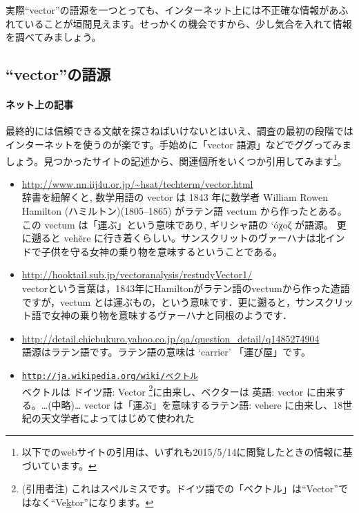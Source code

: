 実際``vector''の語源を一つとっても、インターネット上には不正確な情報があふれていることが垣間見えます。せっかくの機会ですから、少し気合を入れて情報を調べてみましょう。

\subsection{``vector''の語源}

\paragraph{ネット上の記事}

最終的には信頼できる文献を探さねばいけないとはいえ、調査の最初の段階ではインターネットを使うのが楽です。手始めに「vector 語源」などでググってみましょう。見つかったサイトの記述から、関連個所をいくつか引用してみます\footnote{以下でのwebサイトの引用は、いずれも2015/5/14に閲覧したときの情報に基づいています。}。

\begin{itemize}
\item \url{http://www.nn.iij4u.or.jp/~hsat/techterm/vector.html} \\
辞書を紐解くと, 数学用語の vector は 1843 年に数学者 William Rowen Hamilton (ハミルトン)(1805--1865) がラテン語 vectum から作ったとある。この vectum は「運ぶ」という意味であり, ギリシャ語の `\'oχoζ が語源。 更に遡ると veh\u{e}re に行き着くらしい。サンスクリットのヴァーハナは北インドで子供を守る女神の乗り物を意味するということである。
\item \url{ http://hooktail.sub.jp/vectoranalysis/restudyVector1/} \\
vectorという言葉は，1843年にHamiltonがラテン語のvectumから作った造語ですが，vectum とは運ぶもの，という意味です．更に遡ると，サンスクリット語で女神の乗り物を意味するヴァーハナと同根のようです．
\item \url{http://detail.chiebukuro.yahoo.co.jp/qa/question_detail/q1485274904}  \\
語源はラテン語です。ラテン語の意味は `carrier' 「運び屋」です。
\item \href{http://ja.wikipedia.org/wiki/\%E3\%83\%99\%E3\%82\%AF\%E3\%83\%88\%E3\%83\%AB}{\texttt{http://ja.wikipedia.org/wiki/ベクトル}} \\
ベクトルは ドイツ語: Vector \footnote{(引用者注) これはスペルミスです。ドイツ語での「ベクトル」は``Vector''ではなく``Ve\underline{k}tor''になります。}に由来し、ベクターは 英語: vector に由来する。…(中略)… vector は「運ぶ」を意味するラテン語: vehere に由来し、18世紀の天文学者によってはじめて使われた
\end{itemize}

